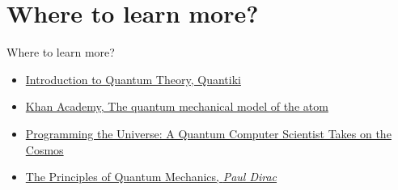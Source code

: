 \documentclass[aspectratio=43]{beamer}
\begin{document}
\section{Where to learn more?}
\begin{frame}{Where to learn more?}
\begin{card}
    \begin{itemize}
        \item \href{https://www.quantiki.org/wiki/introduction-quantum-theory}{Introduction to Quantum Theory, Quantiki}
        \item \href{https://www.khanacademy.org/science/physics/quantum-physics/quantum-numbers-and-orbitals/a/the-quantum-mechanical-model-of-the-atom}{Khan Academy, The quantum mechanical model of the atom}
        \item \href{https://www.goodreads.com/book/show/331680.Programming_the_Universe}{Programming the Universe: A Quantum Computer Scientist Takes on the Cosmos}
        \item \href{https://www.goodreads.com/book/show/260142.The_Principles_of_Quantum_Mechanics}{The Principles of Quantum Mechanics, \textit{Paul Dirac}}
    \end{itemize}
\end{card}
\end{frame}
\end{document}
